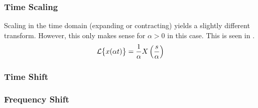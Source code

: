 \subsubsection{Time Scaling}\label{subsubsec:Laplace_Time_Scaling}
Scaling in the time domain (expanding or contracting) yields a slightly different transform.
However, this only makes sense for $\alpha > 0$ in this case.
This is seen in .
\begin{equation}\label{eq:Laplace_Time_Scaling}
  \operatorname{\mathcal{L}} \bigl\lbrace x(\alpha t) \bigr\rbrace = \frac{1}{\alpha} X \left( \frac{s}{\alpha} \right)
\end{equation}

\subsubsection{Time Shift}\label{subsubsec:Laplace_Time_Shift}
\subsubsection{Frequency Shift}\label{subsubsec:Laplace_Frequency_Shift}

